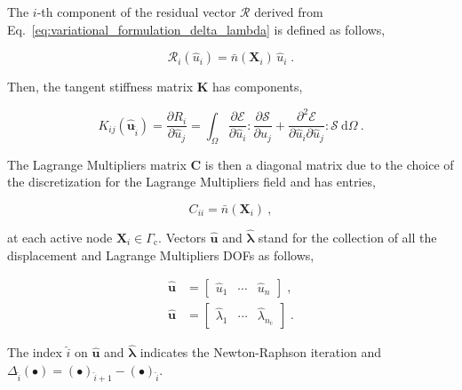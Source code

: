 \documentclass[10pt,a4paper]{article}
\begin{document}
The $i$-th component of the residual vector $\boldsymbol{\mathcal{R}}$ derived from Eq.~\eqref{eq:variational_formulation_delta_lambda} is defined as follows,

\begin{equation}
	\mathcal{R}_i ( \hat{u}_i ) = \bar{n} (\mathbf{X}_i) \, \hat{u}_i \;.
\end{equation}

Then, the tangent stiffness matrix $\mathbf{K}$ has components,

\begin{equation}
	K_{ij} ( \hat{\mathbf{u}}_{\hat{i}} ) = \frac{\partial R_i}{\partial \hat{u}_j} = \int_{\Omega} \frac{\partial \boldsymbol{\mathcal{E}}}{\partial \hat{u}_i} : \frac{\partial \boldsymbol{\mathcal{S}}}{\partial \hat{u}_j} + \frac{\partial^2 \boldsymbol{\mathcal{E}}}{\partial \hat{u}_i \partial \hat{u}_j} : \boldsymbol{\mathcal{S}} \: \text{d} \Omega \:. \label{eq:tangent_stiffness_matrix}
\end{equation}

The Lagrange Multipliers matrix $\mathbf{C}$ is then a diagonal matrix due to the choice of the discretization for the Lagrange Multipliers field and has entries,

\begin{equation}
	C_{ii} = \bar{n} (\mathbf{X}_i) \:,	\label{eq:lagrange_multipliers_matrix}
\end{equation}

at each active node $\mathbf{X}_i \in \Gamma_{\text{c}}$. Vectors $\hat{\mathbf{u}}$ and $\hat{\boldsymbol{\lambda}}$ stand for the collection of all the displacement and Lagrange Multipliers DOFs as follows,

\begin{subequations}
	\begin{alignat}{1}
		\hat{\mathbf{u}} &= \left[ \begin{array}{ccc} \hat{u}_1 & \cdots & \hat{u}_n \end{array} \right] \;, \label{eq:vector_of_displacement_dofs} \\
		\hat{\mathbf{u}} &= \left[ \begin{array}{ccc} \hat{\lambda}_1 & \cdots & \hat{\lambda}_{n_{\text{c}}} \end{array} \right] \;. \label{eq:vector_of_lagrange_multipliers_dofs}
	\end{alignat}
	\label{eq:vectors_of_dofs}
\end{subequations}

The index $\hat{i}$ on $\hat{\mathbf{u}}$ and $\hat{\boldsymbol{\lambda}}$ indicates the Newton-Raphson iteration and $\Delta_{\hat{i}} (\bullet) = (\bullet)_{\hat{i} + 1} - (\bullet)_{\hat{i}}$.
\end{document}
